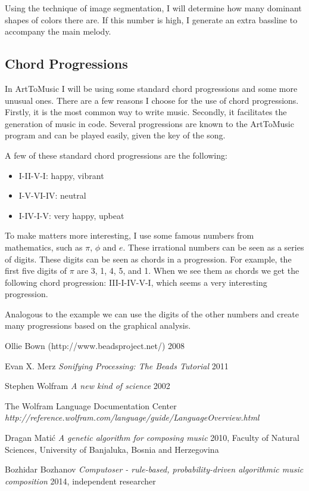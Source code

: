 \documentclass[12pt]{article}
\begin{document}
Using the technique of image segmentation, I will determine how many dominant shapes of colors there are. If this number is high, I generate an extra bassline to accompany the main melody. 

\subsection{Chord Progressions}

In ArtToMusic I will be using some standard chord progressions and some more unusual ones. There are a few reasons I choose for the use of chord progressions. Firstly, it is the most common way to write music. Secondly, it facilitates the generation of music in code. Several progressions are known to the ArtToMusic program and can be played easily, given the key of the song. 
‌\newline

A few of these standard chord progressions are the following:
\begin{itemize}
\item I-II-V-I: happy, vibrant
\item I-V-VI-IV: neutral
\item I-IV-I-V: very happy, upbeat
\end{itemize} 

To make matters more interesting, I use some famous numbers from mathematics, such as $\pi$, $\phi$ and $e$. These irrational numbers can be seen as a series of digits. These digits can be seen as chords in a progression. For example, the first five digits of $\pi$ are 3, 1, 4, 5, and 1. When we see them as chords we get the following chord progression: III-I-IV-V-I, which seems a very interesting progression.
\newline

Analogous to the example we can use the digits of the other numbers and create many progressions based on the graphical analysis.


\begin{thebibliography}{1}

 Ollie Bown (http://www.beadsproject.net/) 2008

 Evan X. Merz {\em Sonifying Processing: The Beads Tutorial} 2011

 Stephen Wolfram {\em A new kind of science} 2002

 The Wolfram Language Documentation Center {\em http://reference.wolfram.com/language/guide/LanguageOverview.html}

 Dragan Mati\'c {\em A genetic algorithm for composing music} 2010, Faculty of Natural Sciences, University of Banjaluka, Bosnia and Herzegovina

 Bozhidar Bozhanov {\em Computoser - rule-based, probability-driven algorithmic music composition} 2014,  independent researcher

\end{thebibliography}
\end{document}
